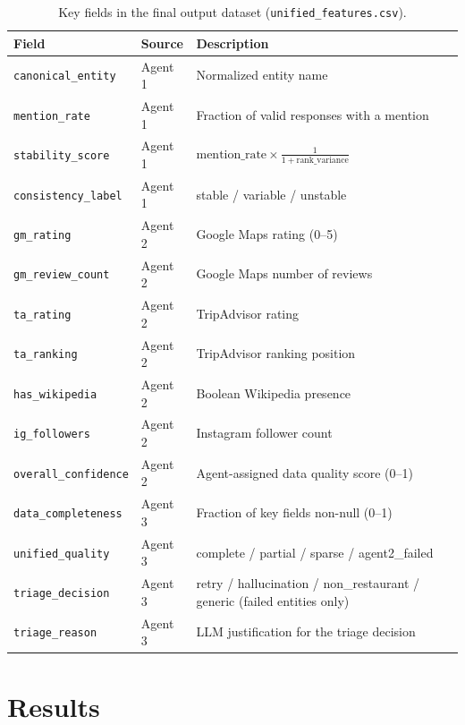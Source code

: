 \begin{table}[H]
\centering
\caption{Key fields in the final output dataset (\texttt{unified\_features.csv}).}
\label{tab:output_schema}
\begin{tabular}{|p{3.8cm}|p{2.2cm}|p{7.2cm}|}
\hline
\textbf{Field} & \textbf{Source} & \textbf{Description} \\
\hline
\texttt{canonical\_entity}   & Agent 1 & Normalized entity name \\
\texttt{mention\_rate}       & Agent 1 & Fraction of valid responses with a mention \\
\texttt{stability\_score}    & Agent 1 & $\text{mention\_rate} \times \frac{1}{1+\text{rank\_variance}}$ \\
\texttt{consistency\_label}  & Agent 1 & stable / variable / unstable \\
\texttt{gm\_rating}          & Agent 2 & Google Maps rating (0--5) \\
\texttt{gm\_review\_count}   & Agent 2 & Google Maps number of reviews \\
\texttt{ta\_rating}          & Agent 2 & TripAdvisor rating \\
\texttt{ta\_ranking}         & Agent 2 & TripAdvisor ranking position \\
\texttt{has\_wikipedia}      & Agent 2 & Boolean Wikipedia presence \\
\texttt{ig\_followers}       & Agent 2 & Instagram follower count \\
\texttt{overall\_confidence} & Agent 2 & Agent-assigned data quality score (0--1) \\
\texttt{data\_completeness}  & Agent 3 & Fraction of key fields non-null (0--1) \\
\texttt{unified\_quality}    & Agent 3 & complete / partial / sparse / agent2\_failed \\
\texttt{triage\_decision}    & Agent 3 & retry / hallucination / non\_restaurant / generic (failed entities only) \\
\texttt{triage\_reason}      & Agent 3 & LLM justification for the triage decision \\
\hline
\end{tabular}
\end{table}

\section{Results}

